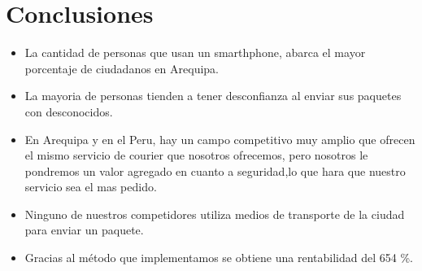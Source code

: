 \chapter{Conclusiones}

\begin{itemize}
\item La cantidad de personas que usan un smarthphone, abarca el mayor porcentaje de  ciudadanos en Arequipa.
\item La mayoria de personas tienden a tener desconfianza  al enviar sus paquetes con desconocidos.
\item En Arequipa y en el Peru, hay un campo competitivo muy amplio que ofrecen el mismo servicio de courier que nosotros ofrecemos, pero nosotros le pondremos un valor agregado en cuanto a seguridad,lo que hara que nuestro servicio sea el mas pedido.
\item Ninguno de nuestros competidores utiliza medios de transporte de la ciudad para enviar un paquete.
\item Gracias al método que implementamos se obtiene una rentabilidad del 654 \%. 

\end{itemize}